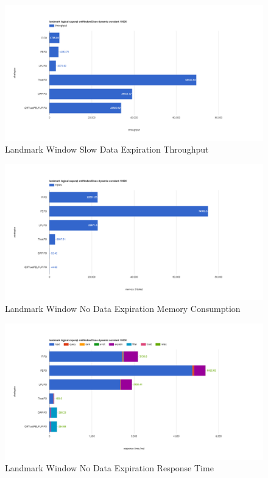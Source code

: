 \begin{figure}[!htbp]
	\centering
    \includegraphics[width=6.5in]{img/app3-land-slow-t.png}
    \caption{Landmark Window Slow Data Expiration Throughput}
\end{figure}
\begin{figure}[!htbp]
	\centering
    \includegraphics[width=6.5in]{img/app3-land-no-m.png}
    \caption{Landmark Window No Data Expiration Memory Consumption}
\end{figure}
\begin{figure}[!htbp]
	\centering
    \includegraphics[width=6.5in]{img/app3-land-no-r.png}
    \caption{Landmark Window No Data Expiration Response Time}
\end{figure}

